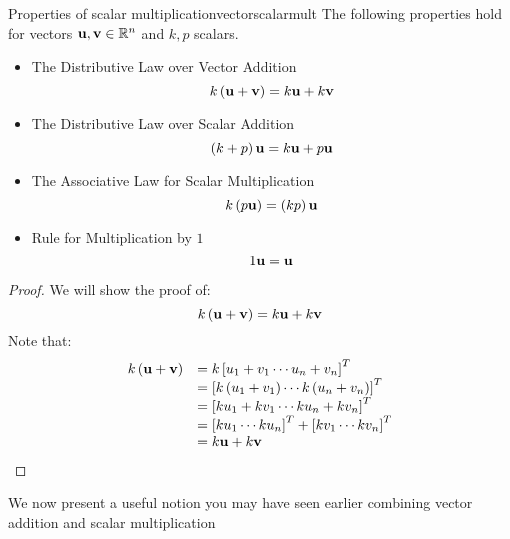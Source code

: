 \begin{theorem}{Properties of scalar multiplication}{vectorscalarmult}
The following properties hold for vectors ${\bf u},{\bf v}\in \mathbb{R}^{n}$ and $k,p $
scalars.
\begin{itemize}
\item The Distributive Law over Vector Addition
\begin{equation*}
k \left( {\bf u}+{\bf v}\right) = k{\bf u}+ k{\bf v}
\end{equation*}
\item The Distributive Law over Scalar Addition
\begin{equation*}
\left( k + p  \right){\bf u} = k {\bf u}+p {\bf u}
\end{equation*}
\item The Associative Law for Scalar Multiplication
\begin{equation*}
k \left( p {\bf u}\right) = \left(k p \right){\bf u}
\end{equation*}
\item Rule for Multiplication by $1$
\begin{equation*}
1{\bf u}={\bf u}  
\end{equation*}
\end{itemize}
\end{theorem}

\begin{proof}
We will show the proof of: 
\begin{equation*}
k \left( {\bf u}+{\bf v}\right) = k {\bf u}+ k {\bf v}
\end{equation*}
Note that:
\begin{equation*}
\begin{array}{ll}
k \left( {\bf u}+{\bf v}\right) & =k \left[ u_{1}+v_{1} \cdots u_{n}+v_{n}\right]^T \\
& = \left[ k \left( u_{1}+v_{1}\right) \cdots k \left( u_{n}+v_{n}\right) \right]^T \\
& = \left[ k u_{1}+ k  v_{1} \cdots k u_{n}+ k v_{n}\right]^T \\
& = \left[ k u_{1} \cdots k u_{n} \right]^T + \left[ k v_{1} \cdots k v_{n} \right]^T \\
& = k {\bf u}+k {\bf v} \\
\end{array}
\end{equation*}
\end{proof}

We now present a useful notion you may have seen earlier combining vector addition and scalar multiplication

